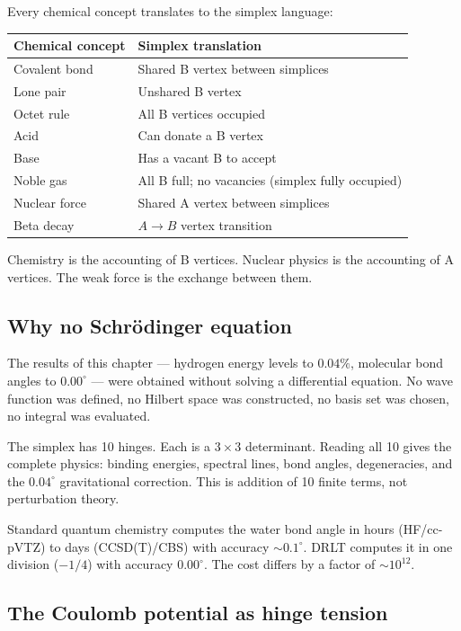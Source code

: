 \documentclass[12pt]{article}
\theoremstyle{remark}
\theoremstyle{definition}
\begin{document}
Every chemical concept translates to the simplex language:

\begin{center}
\begin{tabular}{ll}
\hline
Chemical concept & Simplex translation \\
\hline
Covalent bond & Shared B vertex between simplices \\
Lone pair & Unshared B vertex \\
Octet rule & All B vertices occupied \\
Acid & Can donate a B vertex \\
Base & Has a vacant B to accept \\
Noble gas & All B full; no vacancies (simplex fully occupied) \\
Nuclear force & Shared A vertex between simplices \\
Beta decay & $A \to B$ vertex transition \\
\hline
\end{tabular}
\end{center}

Chemistry is the accounting of B vertices. Nuclear physics is the accounting of A vertices. The weak force is the exchange between them.

\subsection{Why no Schr\"odinger equation}

The results of this chapter --- hydrogen energy levels to $0.04\%$, molecular bond angles to $0.00^\circ$ --- were obtained without solving a differential equation. No wave function was defined, no Hilbert space was constructed, no basis set was chosen, no integral was evaluated.

The simplex has 10 hinges. Each is a $3 \times 3$ determinant. Reading all 10 gives the complete physics: binding energies, spectral lines, bond angles, degeneracies, and the $0.04^\circ$ gravitational correction. This is addition of 10 finite terms, not perturbation theory.

Standard quantum chemistry computes the water bond angle in hours (HF/cc-pVTZ) to days (CCSD(T)/CBS) with accuracy $\sim 0.1^\circ$. DRLT computes it in one division ($-1/4$) with accuracy $0.00^\circ$. The cost differs by a factor of $\sim 10^{12}$.

\subsection{The Coulomb potential as hinge tension}
\label{sec:coulomb_hinge}
\end{document}
